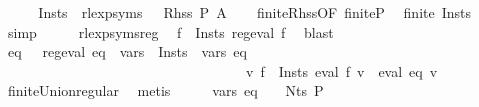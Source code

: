 \begin{isabellebody}
%
\isadelimproof
%
\endisadelimproof
%
\isatagproof
{}\isamarkupfalse%
\ {\isacharminus}{\kern0pt}\isanewline
\ \ \isamarkupfalse%
\ {\isacharquery}{\kern0pt}Insts\ {\isacharequal}{\kern0pt}\ {\isachardoublequoteopen}{\isacharparenleft}{\kern0pt}rlexp{\isacharunderscore}{\kern0pt}syms\ {\isasymgamma}{\isacharprime}{\kern0pt}{\isacharparenright}{\kern0pt}\ {\isacharbackquote}{\kern0pt}\ {\isacharparenleft}{\kern0pt}Rhss\ P\ A{\isacharparenright}{\kern0pt}{\isachardoublequoteclose}\isanewline
\ \ \isamarkupfalse%
\ finite{\isacharunderscore}{\kern0pt}Rhss{\isacharbrackleft}{\kern0pt}OF\ finite{\isacharunderscore}{\kern0pt}P{\isacharbrackright}{\kern0pt}\ \isamarkupfalse%
\ {\isachardoublequoteopen}finite\ {\isacharquery}{\kern0pt}Insts{\isachardoublequoteclose}\ \isamarkupfalse%
\ simp\isanewline
\ \ \isamarkupfalse%
\ \isamarkupfalse%
\ rlexp{\isacharunderscore}{\kern0pt}syms{\isacharunderscore}{\kern0pt}reg\ \isamarkupfalse%
\ {\isachardoublequoteopen}{\isasymforall}f\ {\isasymin}\ {\isacharquery}{\kern0pt}Insts{\isachardot}{\kern0pt}\ reg{\isacharunderscore}{\kern0pt}eval\ f{\isachardoublequoteclose}\ \isamarkupfalse%
\ blast\isanewline
\ \ \isamarkupfalse%
\ \isamarkupfalse%
\ eq\ \ {\isacharasterisk}{\kern0pt}{\isacharcolon}{\kern0pt}\ {\isachardoublequoteopen}reg{\isacharunderscore}{\kern0pt}eval\ eq\ {\isasymand}\ {\isasymUnion}{\isacharparenleft}{\kern0pt}vars\ {\isacharbackquote}{\kern0pt}\ {\isacharquery}{\kern0pt}Insts{\isacharparenright}{\kern0pt}\ {\isacharequal}{\kern0pt}\ vars\ eq\isanewline
\ \ \ \ \ \ \ \ \ \ \ \ \ \ \ \ \ \ \ \ \ \ \ \ \ \ \ \ \ \ \ \ \ \ {\isasymand}\ {\isacharparenleft}{\kern0pt}{\isasymforall}v{\isachardot}{\kern0pt}\ {\isacharparenleft}{\kern0pt}{\isasymUnion}f\ {\isasymin}\ {\isacharquery}{\kern0pt}Insts{\isachardot}{\kern0pt}\ eval\ f\ v{\isacharparenright}{\kern0pt}\ {\isacharequal}{\kern0pt}\ eval\ eq\ v{\isacharparenright}{\kern0pt}{\isachardoublequoteclose}\isanewline
\ \ \ \ \isamarkupfalse%
\ finite{\isacharunderscore}{\kern0pt}Union{\isacharunderscore}{\kern0pt}regular\ \isamarkupfalse%
\ metis\isanewline
\isanewline
\ \ \isamarkupfalse%
\ \isamarkupfalse%
\ {\isachardoublequoteopen}vars\ eq\ {\isasymsubseteq}\ {\isasymgamma}{\isacharprime}{\kern0pt}\ {\isacharbackquote}{\kern0pt}\ Nts\ P{\isachardoublequoteclose}\isanewline

\end{isabellebody}
